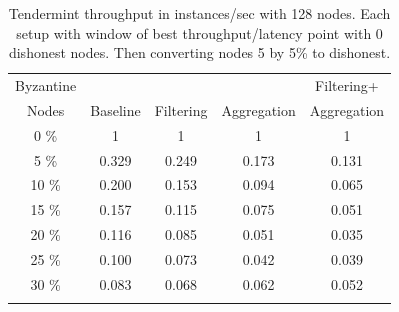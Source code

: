 \begin{table}[h!]
\centering
	\begin{tabular}{c c c c c }
	\hline
     Byzantine     &        &       &       & Filtering+  \\ 
	 Nodes & Baseline   & Filtering    & Aggregation    & Aggregation  \\  \hline
	 0 \%  		    & 		1		&	1	&	1	& 1  \\
	 5 \%  		    & 		0.329		&	0.249	&	0.173	& 0.131  \\
	 10 \%  		& 		0.200		&	0.153	&	0.094	& 0.065  \\
	 15 \%  		& 		0.157		&	0.115	&	0.075	& 0.051  \\
	 20 \%  		& 		0.116		&	0.085	&	0.051	& 0.035  \\
	 25 \%  		& 		0.100		&	0.073	&	0.042	& 0.039  \\
	 30 \%  		& 		0.083		&	0.068	&	0.062	& 0.052  \\ \hline \\
	\end{tabular}
	\caption{Tendermint throughput in instances/sec with 128 nodes. 
 Each setup with window of best throughput/latency point with 0 dishonest nodes.   Then converting nodes 5 by 5\% to dishonest.}
  \label{tab:biz128}
\end{table}









